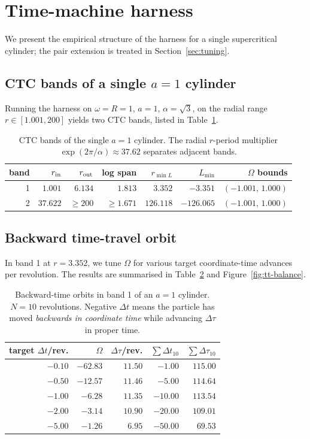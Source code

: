 \documentclass[11pt,a4paper]{article}
\begin{document}
\section{Time-machine harness}
\label{sec:harness}

We present the empirical structure of the harness for a single
supercritical cylinder; the pair extension is treated in
Section~\ref{sec:tuning}.

\subsection{CTC bands of a single $a = 1$ cylinder}

Running the harness on $\omega = R = 1$, $a = 1$, $\alpha = \sqrt 3$,
on the radial range $r \in [1.001, 200]$ yields two CTC bands, listed
in Table~\ref{tab:bands}.

\begin{table}[h]
\centering
\caption{CTC bands of the single $a = 1$ cylinder. The radial
$r$-period multiplier $\exp(2\pi/\alpha) \approx 37.62$ separates
adjacent bands.}
\label{tab:bands}
\begin{tabular}{rrrrrrr}
\toprule
band & $r_{\rm in}$ & $r_{\rm out}$ & log span & $r_{\min L}$ & $L_{\min}$ & $\Omega$ bounds \\
\midrule
1 & $1.001$ & $6.134$ & $1.813$ & $3.352$ & $-3.351$ & $(-1.001,\, 1.000)$ \\
2 & $37.622$ & $\ge 200$ & $\ge 1.671$ & $126.118$ & $-126.065$ & $(-1.001,\, 1.000)$ \\
\bottomrule
\end{tabular}
\end{table}

\subsection{Backward time-travel orbit}

In band 1 at $r = 3.352$, we tune $\Omega$ for various target
coordinate-time advances per revolution. The results are summarised in
Table~\ref{tab:backward} and Figure~\ref{fig:tt-balance}.

\begin{table}[h]
\centering
\caption{Backward-time orbits in band 1 of an $a = 1$ cylinder.
$N = 10$ revolutions. Negative $\Delta t$ means the particle has
moved \emph{backwards in coordinate time} while advancing
$\Delta\tau$ in proper time.}
\label{tab:backward}
\begin{tabular}{rrrrr}
\toprule
target $\Delta t$/rev. & $\Omega$ & $\Delta\tau$/rev. & $\sum\Delta t_{10}$ & $\sum\Delta\tau_{10}$ \\
\midrule
$-0.10$ & $-62.83$ & $11.50$ & $-1.00$ & $115.00$ \\
$-0.50$ & $-12.57$ & $11.46$ & $-5.00$ & $114.64$ \\
$-1.00$ & $-6.28$ & $11.35$ & $-10.00$ & $113.54$ \\
$-2.00$ & $-3.14$ & $10.90$ & $-20.00$ & $109.01$ \\
$-5.00$ & $-1.26$ & $6.95$ & $-50.00$ & $69.53$ \\
\bottomrule
\end{tabular}
\end{table}
\end{document}
